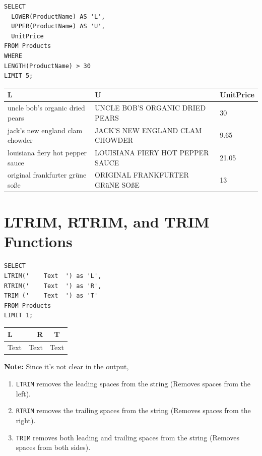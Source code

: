 \documentclass[10pt]{article}
\begin{document}
\begin{verbatim}
SELECT 
  LOWER(ProductName) AS 'L',
  UPPER(ProductName) AS 'U', 
  UnitPrice
FROM Products
WHERE 
LENGTH(ProductName) > 30 
LIMIT 5;
\end{verbatim}



\begin{table}[H]
\begin{tabular}{|l|l|l|}
\hline
L & 	U & 	UnitPrice \\
\hline
uncle bob's organic dried pears	& UNCLE BOB'S ORGANIC DRIED PEARS	& 30 \\
jack's new england clam chowder	& JACK'S NEW ENGLAND CLAM CHOWDER	& 9.65 \\
louisiana fiery hot pepper sauce &	LOUISIANA FIERY HOT PEPPER SAUCE & 	21.05 \\
original frankfurter grüne soße	& ORIGINAL FRANKFURTER GRüNE SOßE &	13 \\
\hline
\end{tabular}
\end{table}



\section{LTRIM, RTRIM, and TRIM Functions}

\begin{verbatim}
SELECT 
LTRIM('    Text  ') as 'L',
RTRIM('    Text  ') as 'R',
TRIM ('    Text  ') as 'T'
FROM Products
LIMIT 1;
\end{verbatim}


\begin{table}[H]
\begin{tabular}{|l|r|c|}
\hline
L & R & T \\
\hline
Text & Text & Text \\
\hline
\end{tabular}
\end{table}

\noindent \textbf{Note:} Since it's not clear in the output, 

\begin{enumerate}
    \item \texttt{LTRIM} removes the leading spaces from the string (Removes spaces from the left).
    \item \texttt{RTRIM} removes the trailing spaces from the string (Removes spaces from the right).
    \item \texttt{TRIM} removes both leading and trailing spaces from the string (Removes spaces from both sides).
\end{enumerate}
\end{document}
